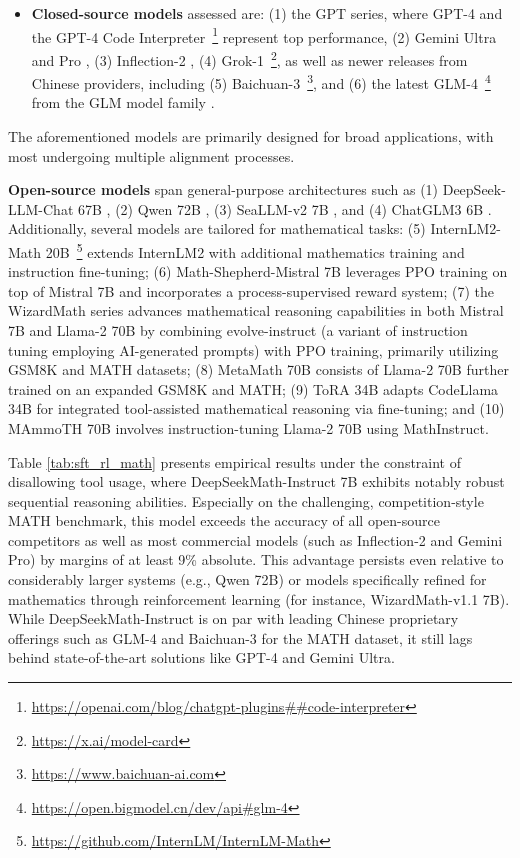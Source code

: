 \begin{itemize}[topsep=0pt]
    \item \textbf{Closed-source models} assessed are: (1) the GPT series, where GPT-4 \citep{gpt4} and the GPT-4 Code Interpreter~\footnote{\url{https://openai.com/blog/chatgpt-plugins\#\#code-interpreter}} represent top performance, (2) Gemini Ultra and Pro \citep{gemini}, (3) Inflection-2 \citep{inflection-2}, (4) Grok-1~\footnote{\url{https://x.ai/model-card}}, as well as newer releases from Chinese providers, including (5) Baichuan-3~\footnote{\url{https://www.baichuan-ai.com}}, and (6) the latest GLM-4~\footnote{\url{https://open.bigmodel.cn/dev/api\#glm-4}} from the GLM model family \citep{glm}.
\end{itemize}

The aforementioned models are primarily designed for broad applications, with most undergoing multiple alignment processes.

\item \textbf{Open-source models} span general-purpose architectures such as (1) DeepSeek-LLM-Chat 67B \citep{deepseek-llm}, (2) Qwen 72B \citep{qwen}, (3) SeaLLM-v2 7B \citep{seallm}, and (4) ChatGLM3 6B \citep{chatglm3}. Additionally, several models are tailored for mathematical tasks: (5) InternLM2-Math 20B~\footnote{\url{https://github.com/InternLM/InternLM-Math}} extends InternLM2 with additional mathematics training and instruction fine-tuning; (6) Math-Shepherd-Mistral 7B leverages PPO training \citep{schulman2017proximal} on top of Mistral 7B \citep{mistral} and incorporates a process-supervised reward system; (7) the WizardMath series \citep{wizardmath} advances mathematical reasoning capabilities in both Mistral 7B and Llama-2 70B \citep{llama2} by combining evolve-instruct (a variant of instruction tuning employing AI-generated prompts) with PPO training, primarily utilizing GSM8K and MATH datasets; (8) MetaMath 70B \citep{metamath} consists of Llama-2 70B further trained on an expanded GSM8K and MATH; (9) ToRA 34B \cite{tora} adapts CodeLlama 34B for integrated tool-assisted mathematical reasoning via fine-tuning; and (10) MAmmoTH 70B \citep{MathInstruct} involves instruction-tuning Llama-2 70B using MathInstruct.

Table \ref{tab:sft_rl_math} presents empirical results under the constraint of disallowing tool usage, where DeepSeekMath-Instruct 7B exhibits notably robust sequential reasoning abilities. Especially on the challenging, competition-style MATH benchmark, this model exceeds the accuracy of all open-source competitors as well as most commercial models (such as Inflection-2 and Gemini Pro) by margins of at least 9\% absolute. This advantage persists even relative to considerably larger systems (e.g., Qwen 72B) or models specifically refined for mathematics through reinforcement learning (for instance, WizardMath-v1.1 7B). While DeepSeekMath-Instruct is on par with leading Chinese proprietary offerings such as GLM-4 and Baichuan-3 for the MATH dataset, it still lags behind state-of-the-art solutions like GPT-4 and Gemini Ultra.

